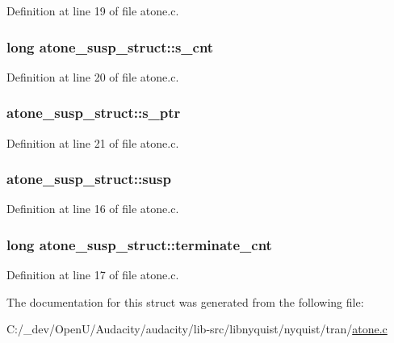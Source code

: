 Definition at line 19 of file atone.\+c.

\subsubsection[{\texorpdfstring{s\+\_\+cnt}{s_cnt}}]{\setlength{\rightskip}{0pt plus 5cm}long atone\+\_\+susp\+\_\+struct\+::s\+\_\+cnt}\hypertarget{structatone__susp__struct_aff0792e76463d11d549386b253f1d5a8}{}\label{structatone__susp__struct_aff0792e76463d11d549386b253f1d5a8}


Definition at line 20 of file atone.\+c.

\subsubsection[{\texorpdfstring{s\+\_\+ptr}{s_ptr}}]{ atone\+\_\+susp\+\_\+struct\+::s\+\_\+ptr}\hypertarget{structatone__susp__struct_a3439f86111f0a79822da1cc68e643fbf}{}\label{structatone__susp__struct_a3439f86111f0a79822da1cc68e643fbf}


Definition at line 21 of file atone.\+c.

\subsubsection[{\texorpdfstring{susp}{susp}}]{ atone\+\_\+susp\+\_\+struct\+::susp}\hypertarget{structatone__susp__struct_ac3e35d355cd9b646c902cf055a134c7d}{}\label{structatone__susp__struct_ac3e35d355cd9b646c902cf055a134c7d}


Definition at line 16 of file atone.\+c.

\subsubsection[{\texorpdfstring{terminate\+\_\+cnt}{terminate_cnt}}]{\setlength{\rightskip}{0pt plus 5cm}long atone\+\_\+susp\+\_\+struct\+::terminate\+\_\+cnt}\hypertarget{structatone__susp__struct_a8ede2f875b503b9e5ac8837c8ec3fbc0}{}\label{structatone__susp__struct_a8ede2f875b503b9e5ac8837c8ec3fbc0}


Definition at line 17 of file atone.\+c.



The documentation for this struct was generated from the following file\+:\begin{DoxyCompactItemize}
\item 
C\+:/\+\_\+dev/\+Open\+U/\+Audacity/audacity/lib-\/src/libnyquist/nyquist/tran/\hyperlink{atone_8c}{atone.\+c}\end{DoxyCompactItemize}
